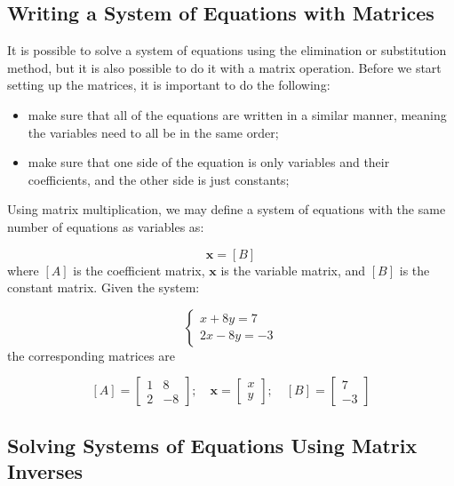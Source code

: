 \subsection{Writing a System of Equations with Matrices}\label{writing-a-system-of-equations-with-matrices}

It is possible to solve a system of equations using the elimination or
substitution method, but it is also possible to do it with a matrix
operation. Before we start setting up the matrices, it is important to
do the following:

\begin{itemize}
\tightlist
\item
  make sure that all of the equations are written in a similar manner,
  meaning the variables need to all be in the same order;
\item
  make sure that one side of the equation is only variables and their
  coefficients, and the other side is just constants;
\end{itemize}

Using matrix multiplication, we may define a
system of equations with the same number of equations as variables as:

\begin{equation} 
[A]\boldsymbol{x} = [B]
\end{equation}
where \([A]\) is the coefficient matrix, \(\boldsymbol{x}\) is the variable matrix, and \([B]\) is the constant matrix. Given the system:

\[
\begin{cases}
x + 8y = 7 \\
2x -8y = -3
\end{cases}
\]
the corresponding matrices are

\[[A]=
\begin{bmatrix}
1 & 8\\
2 & -8
\end{bmatrix}
;\quad
\boldsymbol{x}=
\begin{bmatrix}
x\\
y
\end{bmatrix}
;\quad
[B]=
\begin{bmatrix}
7\\
-3
\end{bmatrix}
\]

\subsection{Solving Systems of Equations Using Matrix Inverses}\label{solving-systems-of-equations-using-matrix-inverses}

